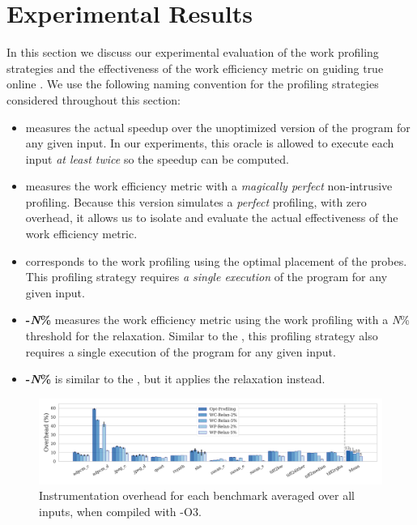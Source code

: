 \section{Experimental Results}\label{sec:results}

In this section we discuss our experimental evaluation of the work profiling strategies and
the effectiveness of the work efficiency metric on guiding true online {\itercomp}.
We use the following naming convention for the profiling strategies considered
throughout this section:
\begin{itemize}[leftmargin=3mm]
\item \textbf{\OracleRM} measures the actual speedup over the unoptimized version of the program for any given input. In our experiments,
    this oracle is allowed to execute each input \emph{at least twice} so the speedup can be computed.
\item \textbf{\OraclePP} measures the work efficiency metric with a \textit{magically perfect} non-intrusive profiling.
  Because this version simulates a \textit{perfect} profiling, with zero overhead,
  it allows us to isolate and evaluate the actual effectiveness of the work efficiency metric.
\item \textbf{\OptProf} corresponds to the work profiling using the optimal placement of the probes. This profiling strategy requires
    \emph{a single execution} of the program for any given input.
\item \textbf{\WCRelax-\textit{N}\%} measures the work efficiency metric using the work profiling with a \textit{N}\% threshold for
the \WCRelaxLower relaxation.
  Similar to the \OptProf, this profiling strategy also requires a single execution of the program for any given input.
\item \textbf{\WPRelax-\textit{N}\%} is similar to the \WCRelax, but it applies the \WPRelaxLower relaxation instead.
\end{itemize}

\begin{figure}[t!]
    \centering
    \includegraphics[width=\textwidth]{figs/overhead-O3.pdf}
    \caption{Instrumentation overhead for each benchmark averaged over all inputs, when compiled with {\flagstype -O3}.}
    \vspace{-3mm}
    \label{fig:overhead-O3}
\end{figure}

